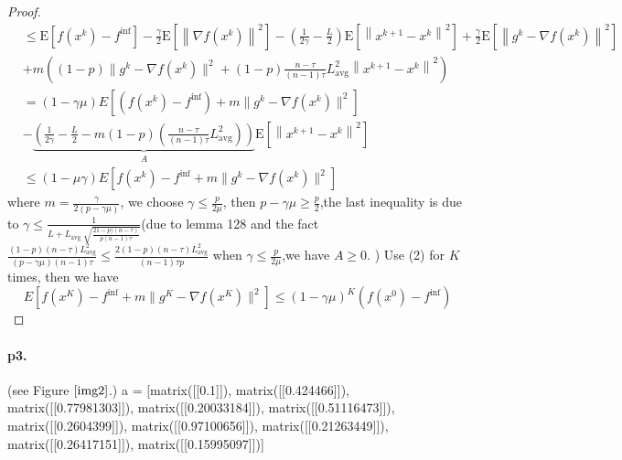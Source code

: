 \documentclass[12pt,a4paper]{article}
\begin{document}
\begin{proof}
\begin{equation}
\begin{aligned}
				&\leq \mathrm{E}\left[f\left(x^{k}\right)-f^{\mathrm{inf}}\right]-\frac{\gamma}{2} \mathrm{E}\left[\left\|\nabla f\left(x^{k}\right)\right\|^{2}\right]-\left(\frac{1}{2 \gamma}-\frac{L}{2}\right) \mathrm{E}\left[\left\|x^{k+1}-x^{k}\right\|^{2}\right] 
				+\frac{\gamma}{2} \mathrm{E}\left[\left\|g^{k}-\nabla f\left(x^{k}\right)\right\|^{2}\right]\\
				&+m\left((1-p)\|g^{k}-\nabla f\left(x^{k}\right)\|^{2}+(1-p)\frac{n-\tau}{(n-1)\tau}L_{\text{avg}}^2\left\|x^{k+1}-x^k\right\|^2
				\right)\\
				&=(1-\gamma\mu)E\left[(f\left(x^{k}\right)-f^{\mathrm{inf}})+m\|g^{k}-\nabla f(x^{k})\|^2\right]\\
				&-\underbrace{\left(\frac{1}{2 \gamma}-\frac{L}{2}-m(1-p)\left(\frac{n-\tau}{(n-1)\tau}L^2_{\text{avg}}\right)\right)}_{A} \mathrm{E}\left[\left\|x^{k+1}-x^{k}\right\|^{2}\right]\\
				&\leq (1-\mu\gamma)E\left[f\left(x^{k}\right)-f^{\mathrm{inf}}+m\|g^{k}-\nabla f(x^{k})\|^2\right]
			\end{aligned}
		\end{equation}
		where $m=\frac{\gamma}{2(p-\gamma\mu)}$, we choose $\gamma\leq \frac{p}{2\mu}$, then $p-\gamma\mu\geq \frac{p}{2}$,the last inequality is due to $\gamma \leq \frac{1}{L+L_{\text {avg }} \sqrt{\frac{21-p)(n-\tau)}{p(n-1) \tau}}}$(due to lemma 128 and the fact $\frac{(1-p)(n-\tau)L^2_{\text{avg}}}{(p-\gamma\mu)(n-1)\tau}\leq \frac{2(1-p)(n-\tau)L^2_{\text{avg}}}{(n-1)\tau p}$ when $\gamma\leq \frac{p}{2\mu}$,we have $A\geq 0$. ) Use (2) for $K$ times, then we have
		\begin{equation*}
			E\left[f\left(x^{K}\right)-f^{\mathrm{inf}}+m\|g^{K}-\nabla f(x^{K})\|^2\right]\leq (1-\gamma\mu)^K(f(x^0)-f^{\inf})
		\end{equation*}
		
	\end{proof}
	\paragraph{p3.}
	(see Figure $\ref{img2}$.)
	a = [matrix([[0.1]]), matrix([[0.424466]]), matrix([[0.77981303]]), matrix([[0.20033184]]), matrix([[0.51116473]]), matrix([[0.2604399]]), matrix([[0.97100656]]), matrix([[0.21263449]]), matrix([[0.26417151]]), matrix([[0.15995097]])]
	
\end{document}
